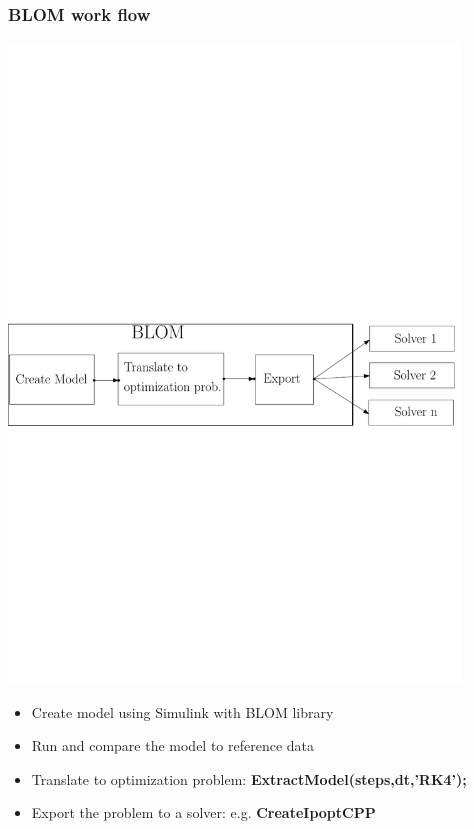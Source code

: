 \documentclass[mathserif]{beamer}
\begin{document}
\begin{frame}
\frametitle{BLOM work flow}
\includegraphics[width=0.9\textwidth]{Flowdgrm}

\begin{itemize}
\item Create model using Simulink with BLOM library
\item Run and compare the model to reference data
\item Translate to optimization problem: {\bf ExtractModel(steps,dt,'RK4');}
\item Export the problem to a solver: e.g. {\bf CreateIpoptCPP }
\end{itemize}

\end{frame}
\end{document}
